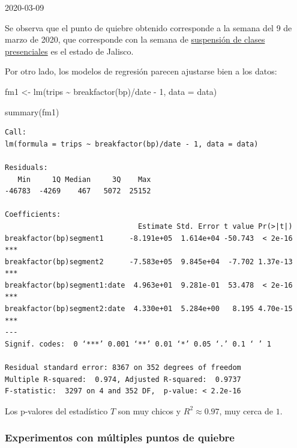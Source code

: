 \documentclass[
]{article}
\newenvironment{Shaded}{}{}
\newcommand{\AttributeTok}[1]{\textcolor[rgb]{0.49,0.56,0.16}{#1}}
\newcommand{\DecValTok}[1]{\textcolor[rgb]{0.25,0.63,0.44}{#1}}
\newcommand{\FunctionTok}[1]{\textcolor[rgb]{0.02,0.16,0.49}{#1}}
\newcommand{\NormalTok}[1]{#1}
\newcommand{\OtherTok}[1]{\textcolor[rgb]{0.00,0.44,0.13}{#1}}
\newcommand{\SpecialCharTok}[1]{\textcolor[rgb]{0.25,0.44,0.63}{#1}}
\begin{document}
2020-03-09

Se observa que el punto de quiebre obtenido corresponde a la semana del
9 de marzo de 2020, que corresponde con la semana de
\href{https://www.animalpolitico.com/2020/03/jalisco-suspende-clases-universidades-eventos-masivos-coronavirus/}{suspensión
de clases presenciales} es el estado de Jalisco.

Por otro lado, los modelos de regresión parecen ajustarse bien a los
datos:

\begin{Shaded}
\begin{Highlighting}[]
\NormalTok{fm1 }\OtherTok{\textless{}{-}} \FunctionTok{lm}\NormalTok{(trips }\SpecialCharTok{\textasciitilde{}} \FunctionTok{breakfactor}\NormalTok{(bp)}\SpecialCharTok{/}\NormalTok{date }\SpecialCharTok{{-}} \DecValTok{1}\NormalTok{, }\AttributeTok{data =}\NormalTok{ data)}
\end{Highlighting}
\end{Shaded}

\begin{Shaded}
\begin{Highlighting}[]
\FunctionTok{summary}\NormalTok{(fm1)}
\end{Highlighting}
\end{Shaded}

\begin{verbatim}
Call:
lm(formula = trips ~ breakfactor(bp)/date - 1, data = data)

Residuals:
   Min     1Q Median     3Q    Max
-46783  -4269    467   5072  25152

Coefficients:
                               Estimate Std. Error t value Pr(>|t|)
breakfactor(bp)segment1      -8.191e+05  1.614e+04 -50.743  < 2e-16 ***
breakfactor(bp)segment2      -7.583e+05  9.845e+04  -7.702 1.37e-13 ***
breakfactor(bp)segment1:date  4.963e+01  9.281e-01  53.478  < 2e-16 ***
breakfactor(bp)segment2:date  4.330e+01  5.284e+00   8.195 4.70e-15 ***
---
Signif. codes:  0 ‘***’ 0.001 ‘**’ 0.01 ‘*’ 0.05 ‘.’ 0.1 ‘ ’ 1

Residual standard error: 8367 on 352 degrees of freedom
Multiple R-squared:  0.974,	Adjusted R-squared:  0.9737
F-statistic:  3297 on 4 and 352 DF,  p-value: < 2.2e-16
\end{verbatim}

Los p-valores del estadístico \(T\) son muy chicos y
\(R^2 \approx 0.97\), muy cerca de \(1\).

\newpage
\hypertarget{experimentos-con-muxfaltiples-puntos-de-quiebre}{%
\subsubsection{Experimentos con múltiples puntos de
quiebre}\label{experimentos-con-muxfaltiples-puntos-de-quiebre}}
\end{document}
